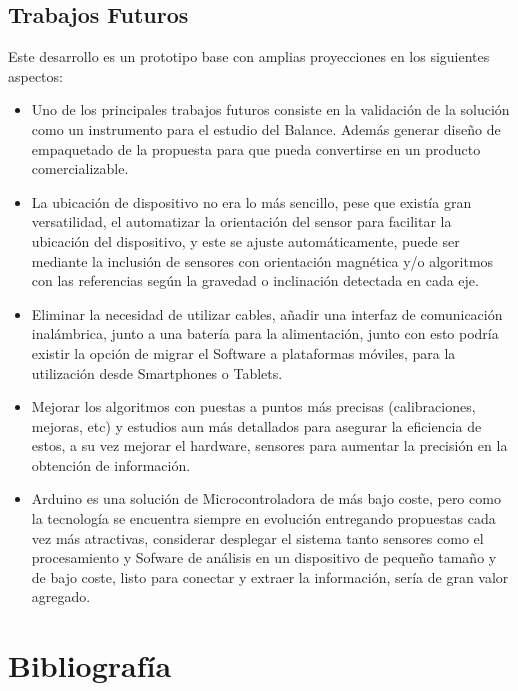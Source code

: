 \documentclass[12pt,a4paper]{article}
\begin{document}
\newpage
\subsection{Trabajos Futuros}
Este desarrollo es un prototipo base con amplias proyecciones en los siguientes aspectos:

\begin{itemize}
	\item Uno de los principales trabajos futuros consiste en la validación de la solución como un instrumento para el estudio del Balance. Además generar diseño de empaquetado de la propuesta para que pueda convertirse en un producto comercializable.
	
	\item La ubicación de dispositivo no era lo más sencillo, pese que existía gran versatilidad, el automatizar la orientación del sensor para facilitar la ubicación del dispositivo, y este se ajuste automáticamente, puede ser mediante la inclusión de sensores con orientación magnética y/o algoritmos con las referencias según la gravedad o inclinación detectada en cada eje.
	
	\item Eliminar la necesidad de utilizar cables, añadir una interfaz de comunicación inalámbrica, junto a una batería para la alimentación, junto con esto podría existir la opción de migrar el Software a plataformas móviles, para la utilización desde Smartphones o Tablets.
	
	\item Mejorar los algoritmos con puestas a puntos más precisas (calibraciones, mejoras, etc) y estudios aun más detallados para asegurar la eficiencia de estos, a su vez mejorar el hardware, sensores para aumentar la precisión en la obtención de información.
	
	\item Arduino es una solución de Microcontroladora de más bajo coste, pero como la tecnología se encuentra siempre en evolución entregando propuestas cada vez más atractivas, considerar desplegar el sistema tanto sensores como el procesamiento y Sofware de análisis en un dispositivo de pequeño tamaño y de bajo coste, listo para conectar y extraer la información, sería de gran valor agregado.
	
\end{itemize}

\section{Bibliografía}
\printbibliography[heading=none]
\end{document}
